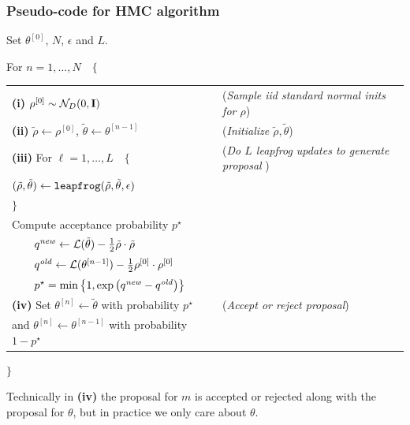 \subsubsection{Pseudo-code for HMC algorithm}


\noindent Set $\theta^{[0]}$, $N$, $\epsilon$ and $L$.

\noindent For $n = 1, \dots, N \quad \{$ 

\begin{tabular}{ll}
{\bf (i)} $\rho^{[0]} \sim \mathcal{N}_D(0, \mathbf{I})$ & ({\it Sample iid standard normal inits for $\rho$}) \\

{\bf (ii)} $\tilde{\rho} \leftarrow \rho^{[0]}$, $\tilde{\theta} \leftarrow \theta^{[n-1]}$ &  ({\it Initialize $\tilde{\rho}, \tilde{\theta}$})\\

{\bf (iii)} For $\ell = 1, \dots, L \quad \{$  & ({\it Do $L$ leapfrog updates to generate proposal }) \\[-8pt]

\qquad $(\tilde{\rho}, \tilde{\theta}) \leftarrow {\tt leapfrog}(\tilde{\rho}, \tilde{\theta}, \epsilon)$ & \\[-8pt]
\quad $\}$ & \\

\quad Compute acceptance probability $p^\star$  & \\[-8pt]
$\qquad  q^{\it new} \leftarrow  \mathcal{L}(\tilde{\theta}) - \tfrac{1}{2} \tilde{\rho} \cdot \tilde{\rho} $ & \\[-8pt]
$ \qquad q^{\it old} \leftarrow   \mathcal{L}(\theta^{[n-1]} ) -  \tfrac{1}{2} \rho^{[0]} \cdot \rho^{[0]} $ & \\[-8pt]
$ \qquad p^\star = \min{\left\{1, \exp{\left( q^{\it new} - q^{\it old} \right)} \right\}} $& \\[3pt]

{\bf (iv)} Set $\theta^{[n]} \leftarrow \tilde{\theta}$ with probability $p^\star$  & ({\it Accept or reject proposal})\\
\qquad and $\theta^{[n]} \leftarrow \theta^{[n-1]}$ with probability $ 1 - p^\star$ & \\

\end{tabular}

\noindent $\}$

\noindent Technically in {\bf (iv)} the proposal for $m$ is accepted or rejected along with the proposal for 
$\theta$, but in practice we only care about $\theta$. 

